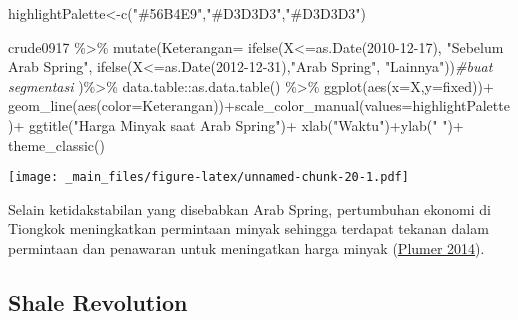 \documentclass[
]{book}
\newenvironment{Shaded}{\begin{snugshade}}{\end{snugshade}}
\newcommand{\AttributeTok}[1]{\textcolor[rgb]{0.77,0.63,0.00}{#1}}
\newcommand{\CommentTok}[1]{\textcolor[rgb]{0.56,0.35,0.01}{\textit{#1}}}
\newcommand{\FunctionTok}[1]{\textcolor[rgb]{0.00,0.00,0.00}{#1}}
\newcommand{\NormalTok}[1]{#1}
\newcommand{\OtherTok}[1]{\textcolor[rgb]{0.56,0.35,0.01}{#1}}
\newcommand{\SpecialCharTok}[1]{\textcolor[rgb]{0.00,0.00,0.00}{#1}}
\newcommand{\StringTok}[1]{\textcolor[rgb]{0.31,0.60,0.02}{#1}}
\begin{document}
\begin{Shaded}
\begin{Highlighting}[]
\NormalTok{highlightPalette}\OtherTok{\textless{}{-}}\FunctionTok{c}\NormalTok{(}\StringTok{"\#56B4E9"}\NormalTok{,}\StringTok{"\#D3D3D3"}\NormalTok{,}\StringTok{"\#D3D3D3"}\NormalTok{)}

\NormalTok{crude0917 }\SpecialCharTok{\%\textgreater{}\%}
  \FunctionTok{mutate}\NormalTok{(}\AttributeTok{Keterangan=}
           \FunctionTok{ifelse}\NormalTok{(X}\SpecialCharTok{\textless{}=}\FunctionTok{as.Date}\NormalTok{(}\StringTok{\textquotesingle{}2010{-}12{-}17\textquotesingle{}}\NormalTok{), }\StringTok{"Sebelum Arab Spring"}\NormalTok{,}
           \FunctionTok{ifelse}\NormalTok{(X}\SpecialCharTok{\textless{}=}\FunctionTok{as.Date}\NormalTok{(}\StringTok{\textquotesingle{}2012{-}12{-}31\textquotesingle{}}\NormalTok{),}\StringTok{"Arab Spring"}\NormalTok{,}
            \StringTok{"Lainnya"}\NormalTok{))}\CommentTok{\#buat segmentasi }
\NormalTok{  )}\SpecialCharTok{\%\textgreater{}\%}\NormalTok{ data.table}\SpecialCharTok{::}\FunctionTok{as.data.table}\NormalTok{() }\SpecialCharTok{\%\textgreater{}\%}
  \FunctionTok{ggplot}\NormalTok{(}\FunctionTok{aes}\NormalTok{(}\AttributeTok{x=}\NormalTok{X,}\AttributeTok{y=}\NormalTok{fixed))}\SpecialCharTok{+}
  \FunctionTok{geom\_line}\NormalTok{(}\FunctionTok{aes}\NormalTok{(}\AttributeTok{color=}\NormalTok{Keterangan))}\SpecialCharTok{+}\FunctionTok{scale\_color\_manual}\NormalTok{(}\AttributeTok{values=}\NormalTok{highlightPalette)}\SpecialCharTok{+}
  \FunctionTok{ggtitle}\NormalTok{(}\StringTok{"Harga Minyak saat Arab Spring"}\NormalTok{)}\SpecialCharTok{+}
  \FunctionTok{xlab}\NormalTok{(}\StringTok{"Waktu"}\NormalTok{)}\SpecialCharTok{+}\FunctionTok{ylab}\NormalTok{(}\StringTok{" "}\NormalTok{)}\SpecialCharTok{+}
  \FunctionTok{theme\_classic}\NormalTok{()}
\end{Highlighting}
\end{Shaded}

\texttt{[image: \_main\_files/figure-latex/unnamed-chunk-20-1.pdf]}

Selain ketidakstabilan yang disebabkan Arab Spring, pertumbuhan ekonomi di Tiongkok meningkatkan permintaan minyak sehingga terdapat tekanan dalam permintaan dan penawaran untuk meningatkan harga minyak (\protect\hyperlink{ref-voxoil}{Plumer 2014}).

\hypertarget{shale-revolution}{%
\subsection{Shale Revolution}\label{shale-revolution}}
\end{document}
